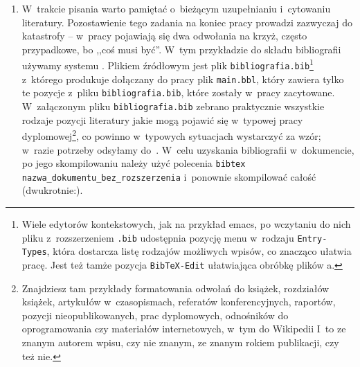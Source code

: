 \begin{enumerate}
\item W~trakcie pisania warto pamiętać o~bieżącym uzupełnianiu i~cytowaniu literatury. Pozostawienie tego zadania na koniec pracy prowadzi zazwyczaj do katastrofy -- w~pracy pojawiają się dwa odwołania na krzyż, często przypadkowe, bo ,,coś musi być''. W~tym przykładzie do składu bibliografii używamy systemu \BibTeX{}. Plikiem źródłowym jest plik \verb+bibliografia.bib+\footnote{Wiele edytorów kontekstowych, jak na przykład emacs, po wczytaniu do nich pliku z~rozszerzeniem \texttt{.bib} udostępnia pozycję menu w~rodzaju \texttt{Entry-Types}, która dostarcza listę rodzajów możliwych wpisów, co znacząco ułatwia pracę. Jest też tamże pozycja \texttt{BibTeX-Edit} ułatwiająca obróbkę plików \BibTeX{}a.} z~którego \BibTeX{} produkuje dołączany do pracy plik \verb+main.bbl+, który zawiera tylko te pozycje z~pliku \verb+bibliografia.bib+, które zostały w~pracy zacytowane. W~załączonym pliku \verb+bibliografia.bib+ zebrano praktycznie wszystkie rodzaje pozycji literatury jakie mogą pojawić się w~typowej pracy dyplomowej\footnote{Znajdziesz tam przykłady formatowania odwołań do książek, rozdziałów książek, artykułów w~czasopismach, referatów konferencyjnych, raportów, pozycji nieopublikowanych, prac dyplomowych, odnośników do oprogramowania czy materiałów internetowych, w~tym do Wikipedii \smiley{} I~to ze znanym autorem wpisu, czy nie znanym, ze znanym rokiem publikacji, czy też nie.}, co powinno w~typowych sytuacjach wystarczyć za wzór; w~razie potrzeby odsyłamy do~\cite{bibtex_entries}. W~celu uzyskania bibliografii w~dokumencie, po jego skompilowaniu należy użyć polecenia \texttt{bibtex nazwa\_dokumentu\_bez\_rozszerzenia} i~ponownie skompilować całość (dwukrotnie:).


\end{enumerate}
